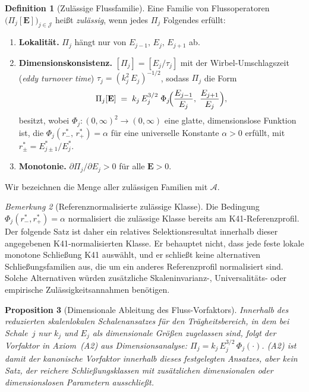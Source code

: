 \documentclass[12pt,a4paper]{article}
\theoremstyle{definition}
\newtheorem{definition}{Definition}[section]
\theoremstyle{plain}
\newtheorem{proposition}[definition]{Proposition}
\theoremstyle{remark}
\newtheorem{remark}[definition]{Bemerkung}
\begin{document}
\begin{definition}[Zulässige Flussfamilie]\label{def:admissible}
Eine Familie von Flussoperatoren $\bigl(\Pi_j[\mathbf{E}]\bigr)_{j \in
\mathcal{J}}$ heißt \emph{zulässig}, wenn jedes $\Pi_j$ Folgendes erfüllt:
\begin{enumerate}
  \item[\textup{(A1)}] \textbf{Lokalität.}\;
    $\Pi_j$ hängt nur von $E_{j-1},\, E_j,\, E_{j+1}$ ab.
  \item[\textup{(A2)}] \textbf{Dimensionskonsistenz.}\;
    $[\Pi_j] = [E_j / \tau_j]$ mit der Wirbel-Umschlagszeit (\emph{eddy turnover time})
    $\tau_j = (k_j^2\,E_j)^{-1/2}$, sodass $\Pi_j$ die Form
    \begin{equation}\label{eq:closure_general}
      \Pi_j[\mathbf{E}]
      \;=\;
      k_j\,E_j^{3/2}\;\Phi_j\!\Bigl(
        \frac{E_{j-1}}{E_j},\;
        \frac{E_{j+1}}{E_j}
      \Bigr),
    \end{equation}
    besitzt, wobei $\Phi_j : (0,\infty)^2 \to (0,\infty)$ eine glatte,
    dimensionslose Funktion ist, die $\Phi_j(r^*_{-},\, r^*_{+}) = \alpha$
    für eine universelle Konstante $\alpha > 0$ erfüllt, mit
    $r^*_{\pm} = E_{j \pm 1}^* / E_j^*$.
  \item[\textup{(A3)}] \textbf{Monotonie.}\;
    $\partial \Pi_j / \partial E_j > 0$ für alle $\mathbf{E} > 0$.
\end{enumerate}
Wir bezeichnen die Menge aller zulässigen Familien mit $\mathscr{A}$.
\end{definition}

\begin{remark}[Referenznormalisierte zulässige Klasse]\label{rem:reference-normalized-class}\label{rem:reference-normalised-class}
Die Bedingung $\Phi_j(r^*_{-},r^*_{+})=\alpha$ normalisiert die zulässige
Klasse bereits am K41-Referenzprofil. Der folgende Satz ist daher ein
relatives Selektionsresultat innerhalb dieser angegebenen K41-normalisierten
Klasse. Er behauptet nicht, dass jede feste lokale monotone Schließung K41
auswählt, und er schließt keine alternativen Schließungsfamilien aus, die um
ein anderes Referenzprofil normalisiert sind. Solche Alternativen würden
zusätzliche Skaleninvarianz-, Universalitäts- oder empirische
Zulässigkeitsannahmen benötigen.
\end{remark}

\begin{proposition}[Dimensionale Ableitung des Fluss-Vorfaktors]\label{prop:A2-derived}
Innerhalb des reduzierten skalenlokalen Schalenansatzes für den Trägheitsbereich, in dem
bei Schale~$j$ nur $k_j$ und $E_j$ als dimensionale Größen zugelassen sind,
folgt der Vorfaktor in Axiom~\textup{(A2)} aus Dimensionsanalyse:
$\Pi_j = k_j\,E_j^{3/2}\,\Phi_j(\cdot)$.  (A2) ist damit der kanonische
Vorfaktor innerhalb dieses festgelegten Ansatzes, aber kein Satz, der
reichere Schließungsklassen mit zusätzlichen dimensionalen oder
dimensionslosen Parametern ausschließt.
\end{proposition}
\end{document}
